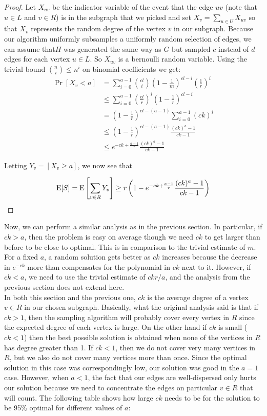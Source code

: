 \begin{proof}
Let $X_{uv}$ be the indicator variable of the event that the edge $uv$
(note that $u\in L$ and $v\in R$) is in the subgraph that we picked
and set $X_{v} = \sum_{u\in U} X_{uv}$ so that $X_{v}$ represents the
random degree of the vertex $v$ in our subgraph. Because our algorithm
uniformly subsamples a uniformly random selection of edges, we can
assume that$H$ was generated the same way as $G$ but sampled $c$
instead of $d$ edges for each vertex $u\in L$. So $X_{uv}$ is a
bernoulli random variable. Using the trivial bound $\binom{n}{i}
\leq n^i$ on binomial coefficients we get:
\begin{align*}
      \Pr[X_v < a]
&=    \sum_{i=0}^{a-1} \binom{cl}{i} \left(1-\frac{1}{m}\right)^{cl-i}\left(\frac{1}{r}\right)^i \\
&\leq \sum_{i=0}^{a-1} \left(\frac{cl}{r}\right)^i\left(1-\frac{1}{r}\right)^{cl-i} \\
&=    \left(1-\frac{1}{r}\right)^{cl-(a-1)}\sum_{i=0}^{a-1} (ck)^i \\
&\leq \left(1-\frac{1}{r}\right)^{cl-(a-1)}\frac{(ck)^a-1}{ck-1} \\
&\leq e^{-ck+\frac{a-1}{r}} \frac{(ck)^a-1}{ck-1}
\end{align*}


Letting $Y_v = \left[X_v \geq a\right]$, we now see that

\[ \text{E}[S] = \text{E}\left[\sum_{v\in R} Y_v\right] \geq r\left(1-e^{-ck+\frac{a-1}{r}} \frac{(ck)^a-1}{ck-1}\right) \]
\end{proof}

Now, we can perform a similar analysis as in the previous section. In
particular, if $ck>a$, then the problem is easy on average though we
need $ck$ to get larger than before to be close to optimal. This
is in comparison to the trivial estimate of $m$. For a fixed $a$, a
random solution gets better as $ck$ increases because the decrease in
$e^{-ck}$ more than compensates for the polynomial in $ck$ next to
it. However, if $ck<a$, we need to use the trivial estimate of
$ckr/a$, and the analysis from the previous section does not extend
here. \\

In both this section and the previous one, $ck$ is the average degree
of a vertex $v\in R$ in our chosen subgraph. Basically, what the
original analysis said is that if $ck>1$, then the sampling algorithm
will probably cover every vertex in $R$ since the expected degree of
each vertex is large. On the other hand if $ck$ is small ($ck < 1$)
then the best possible solution is obtained when none of the vertices
in $R$ has degree greater than 1. If $ck<1$, then we do not cover very
many vertices in $R$, but we also do not cover many vertices more than
once. Since the optimal solution in this case was correspondingly low,
our solution was good in the $a=1$ case. However, when $a<1$, the fact
that our edges are well-dispersed only hurts our solution because we
need to concentrate the edges on particular $v\in R$ that will
count. The following table shows how large $ck$ needs to be for the
solution to be 95\% optimal for different values of $a$:

